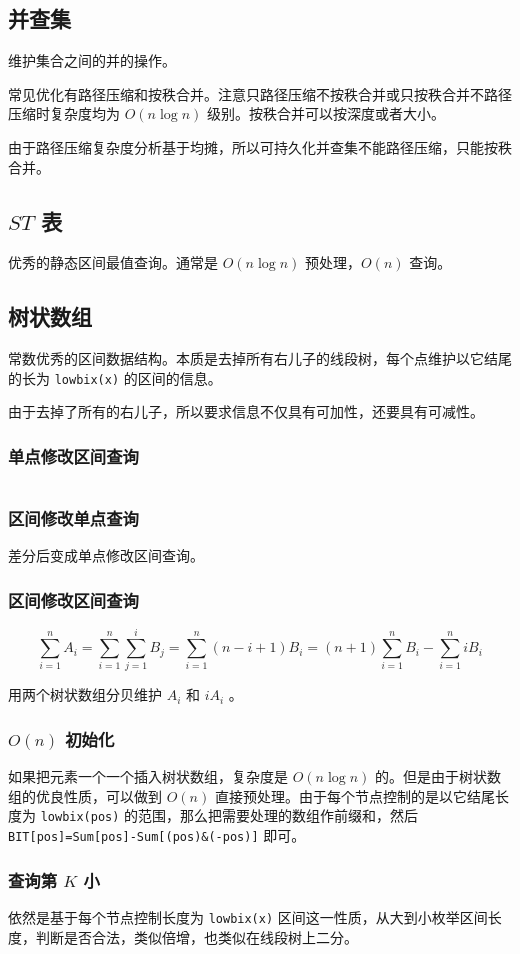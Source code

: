 \documentclass[UTF-8]{ctexart}
\newcommand{\cpp}[1]{\inputminted[bgcolor=bg,breaklines,breakanywhere=true]{c++}{#1}}
\begin{document}
		\subsection{并查集}
		维护集合之间的并的操作。
	
		常见优化有路径压缩和按秩合并。注意只路径压缩不按秩合并或只按秩合并不路径压缩时复杂度均为 $O(n\log n)$ 级别。按秩合并可以按深度或者大小。
	
		由于路径压缩复杂度分析基于均摊，所以可持久化并查集不能路径压缩，只能按秩合并。
		\subsection{$ST$ 表}
		优秀的静态区间最值查询。通常是 $O(n\log n)$ 预处理，$O(n)$ 查询。
		\subsection{树状数组}
		常数优秀的区间数据结构。本质是去掉所有右儿子的线段树，每个点维护以它结尾的长为 \texttt{lowbix(x)} 的区间的信息。
	
		由于去掉了所有的右儿子，所以要求信息不仅具有可加性，还要具有可减性。
			\subsubsection{单点修改区间查询}
			\cpp{code//DataStruct//fenwickbase.cpp}
			\subsubsection{区间修改单点查询}
			差分后变成单点修改区间查询。
			\subsubsection{区间修改区间查询}
			$$\sum_{i=1}^{n} A_i=\sum_{i=1}^n \sum_{j=1}^i B_j=\sum_{i=1}^n (n-i+1)B_i=(n+1)\sum_{i=1}^n B_i-\sum_{i=1}^n iB_i$$
	
			用两个树状数组分贝维护 $A _ i$ 和 $iA _ i$ 。
			\subsubsection{ $O(n)$ 初始化}
			如果把元素一个一个插入树状数组，复杂度是 $O(n\log n)$ 的。但是由于树状数组的优良性质，可以做到 $O(n)$ 直接预处理。由于每个节点控制的是以它结尾长度为 \texttt{lowbix(pos)} 的范围，那么把需要处理的数组作前缀和，然后 \texttt{BIT[pos]=Sum[pos]-Sum[(pos)\&(-pos)]} 即可。
			\subsubsection{查询第 $K$ 小}
			依然是基于每个节点控制长度为 \texttt{lowbix(x)} 区间这一性质，从大到小枚举区间长度，判断是否合法，类似倍增，也类似在线段树上二分。
			\cpp{code//DataStruct//fenwickkth.cpp}
\end{document}
